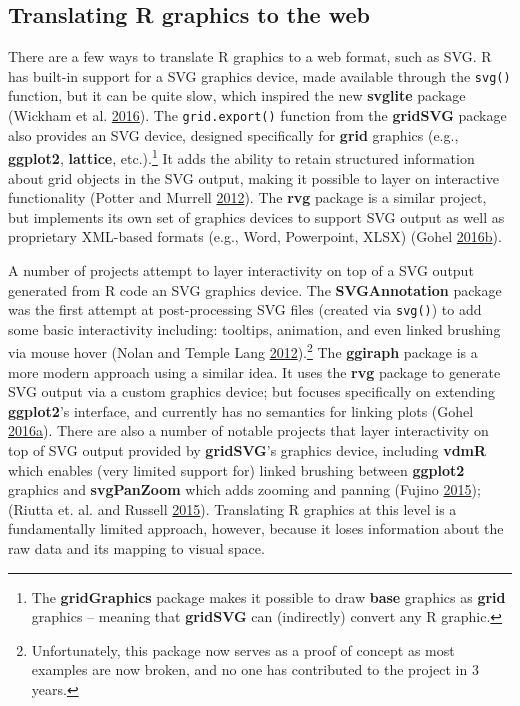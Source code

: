 \documentclass[12pt,]{isuthesis}
\let\rmarkdownfootnote\footnote%
\def\footnote{\protect\rmarkdownfootnote}
\begin{document}
\subsection{Translating R graphics to the
web}\label{translating-r-graphics-to-the-web}

There are a few ways to translate R graphics to a web format, such as
SVG. R has built-in support for a SVG graphics device, made available
through the \texttt{svg()} function, but it can be quite slow, which
inspired the new \textbf{svglite} package (Wickham et al.
\protect\hyperlink{ref-svglite}{2016}). The \texttt{grid.export()}
function from the \textbf{gridSVG} package also provides an SVG device,
designed specifically for \textbf{grid} graphics (e.g.,
\textbf{ggplot2}, \textbf{lattice}, etc.).\footnote{The
  \textbf{gridGraphics} package makes it possible to draw \textbf{base}
  graphics as \textbf{grid} graphics -- meaning that \textbf{gridSVG}
  can (indirectly) convert any R graphic.} It adds the ability to retain
structured information about grid objects in the SVG output, making it
possible to layer on interactive functionality (Potter and Murrell
\protect\hyperlink{ref-gridSVGreport}{2012}). The \textbf{rvg} package
is a similar project, but implements its own set of graphics devices to
support SVG output as well as proprietary XML-based formats (e.g., Word,
Powerpoint, XLSX) (Gohel
\protect\hyperlink{ref-rvg}{2016}\protect\hyperlink{ref-rvg}{b}).

A number of projects attempt to layer interactivity on top of a SVG
output generated from R code an SVG graphics device. The
\textbf{SVGAnnotation} package was the first attempt at post-processing
SVG files (created via \texttt{svg()}) to add some basic interactivity
including: tooltips, animation, and even linked brushing via mouse hover
(Nolan and Temple Lang
\protect\hyperlink{ref-SVGAnnotation}{2012}).\footnote{Unfortunately,
  this package now serves as a proof of concept as most examples are now
  broken, and no one has contributed to the project in 3 years.} The
\textbf{ggiraph} package is a more modern approach using a similar idea.
It uses the \textbf{rvg} package to generate SVG output via a custom
graphics device; but focuses specifically on extending
\textbf{ggplot2}'s interface, and currently has no semantics for linking
plots (Gohel
\protect\hyperlink{ref-ggiraph}{2016}\protect\hyperlink{ref-ggiraph}{a}).
There are also a number of notable projects that layer interactivity on
top of SVG output provided by \textbf{gridSVG}'s graphics device,
including \textbf{vdmR} which enables (very limited support for) linked
brushing between \textbf{ggplot2} graphics and \textbf{svgPanZoom} which
adds zooming and panning (Fujino \protect\hyperlink{ref-vdmR}{2015});
(Riutta et. al. and Russell \protect\hyperlink{ref-svgPanZoom}{2015}).
Translating R graphics at this level is a fundamentally limited
approach, however, because it loses information about the raw data and
its mapping to visual space.
\end{document}
